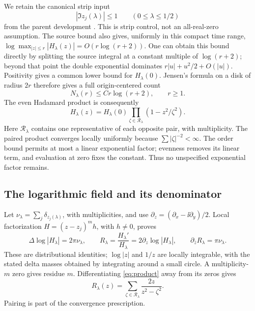 We retain the canonical strip input
\begin{equation}\label{eq:zero-strip}
 |\Im z_j(\lambda)|\le1\qquad(0\le\lambda\le1/2)
\end{equation}
from the parent development \cite{OGParent,GreenStripProof}.
This is strip control, not an all-real-zero assumption.
The source bound also gives, uniformly in this compact time range,
\(\log\max_{|z|\le r}|H_\lambda(z)|=O(r\log(r+2))\).
One can obtain this bound directly by splitting the source integral
at a constant multiple of \(\log(r+2)\); beyond that point the
double exponential dominates \(r|u|+u^2/2+O(|u|)\).
Positivity gives a common lower bound for \(H_\lambda(0)\).
Jensen's formula on a disk of radius \(2r\) therefore gives a
full origin-centered count
\begin{equation}\label{eq:count}
 N_\lambda(r)\le Cr\log(r+2),\qquad r\ge1.
\end{equation}
The even Hadamard product is consequently
\begin{equation}\label{eq:product}
 H_\lambda(z)=H_\lambda(0)
 \prod_{\zeta\in\mathcal R_\lambda}(1-z^2/\zeta^2).
\end{equation}
Here \(\mathcal R_\lambda\) contains one representative of each
opposite pair, with multiplicity. The paired product converges
locally uniformly because \(\sum|\zeta|^{-2}<\infty\). The order
bound permits at most a linear exponential factor; evenness removes
its linear term, and evaluation at zero fixes the constant.
Thus no unspecified exponential factor remains.

\subsection{The logarithmic field and its denominator}

Let \(\nu_\lambda=\sum_j\delta_{z_j(\lambda)}\), with multiplicities,
and use \(\partial_z=(\partial_x-\ii\partial_y)/2\).
Local factorization \(H=(z-z_j)^m h\), with \(h\ne0\), proves
\begin{equation}\label{eq:distributions}
 \Delta\log|H_\lambda|=2\pi\nu_\lambda,\qquad
 R_\lambda=\frac{H_\lambda'}{H_\lambda}
           =2\partial_z\log|H_\lambda|,\qquad
 \partial_{\bar z}R_\lambda=\pi\nu_\lambda .
\end{equation}
These are distributional identities; \(\log|z|\) and \(1/z\) are
locally integrable, with the stated delta masses obtained by integrating
around a small circle. A multiplicity-\(m\) zero gives residue \(m\).
Differentiating \eqref{eq:product} away from its zeros gives
\[
 R_\lambda(z)=\sum_{\zeta\in\mathcal R_\lambda}
                    \frac{2z}{z^2-\zeta^2}.
\]
Pairing is part of the convergence prescription.

